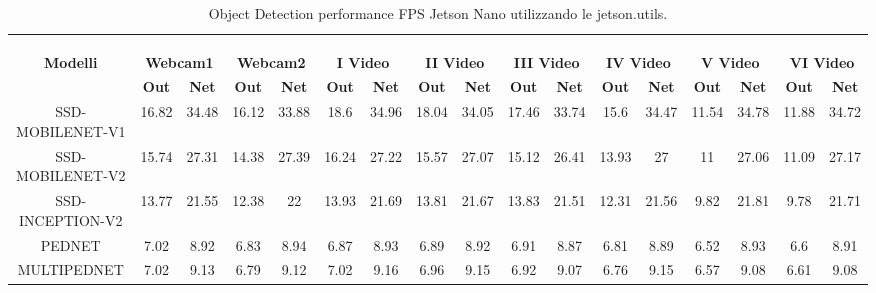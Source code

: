 \begin{landscape}
    \centering
    \begin{table}
        {\scriptsize %
        \begin{tabular}{|c||c|c||c|c||c|c||c|c||c|c||c|c||c|c||c|c||}
            \hline
            & \multicolumn{16}{c||}{ \multirow{3}{*}{\bfseries{\large OBJECT DETECTION (DETECTNET) - JETSON NANO (utils)}}}\\
            & \multicolumn{16}{c||}{}\\
            & \multicolumn{16}{c||}{}\\
            \hline
            \multirow{2}{*}{\bfseries{\large Modelli}} 
            & \multicolumn{2}{c||}{\bfseries{\normalsize Webcam1}} & \multicolumn{2}{c||}{\bfseries{\normalsize Webcam2}} & \multicolumn{2}{c||}{\bfseries{\normalsize \RN{1} Video}} & \multicolumn{2}{c||}{\bfseries{\normalsize \RN{2} Video}} & \multicolumn{2}{c||}{\bfseries{\normalsize \RN{3} Video}} & \multicolumn{2}{c||}{\bfseries{\normalsize \RN{4} Video}} & \multicolumn{2}{c||}{\bfseries{\normalsize \RN{5} Video}} & \multicolumn{2}{c||}{\bfseries{\normalsize \RN{6} Video}}\\            & \bfseries{\footnotesize Out} & \bfseries{\footnotesize Net} & \bfseries{\footnotesize Out} & \bfseries{\footnotesize Net} & \bfseries{\footnotesize Out} & \bfseries{\footnotesize Net} & \bfseries{\footnotesize Out} & \bfseries{\footnotesize Net} & \bfseries{\footnotesize Out} & \bfseries{\footnotesize Net} & \bfseries{\footnotesize Out} & \bfseries{\footnotesize Net} & \bfseries{\footnotesize Out} & \bfseries{\footnotesize Net} & \bfseries{\footnotesize Out} & \bfseries{\footnotesize Net}\\
            \hline
            SSD-MOBILENET-V1& 16.82 & 34.48 & 16.12 & 33.88 & 18.6 & 34.96 & 18.04 & 34.05 & 17.46 & 33.74 & 15.6 & 34.47 & 11.54 & 34.78 & 11.88 & 34.72\\
            \hline
            SSD-MOBILENET-V2& 15.74 & 27.31 & 14.38 & 27.39 & 16.24 & 27.22 & 15.57 & 27.07 & 15.12 & 26.41 & 13.93 & 27 & 11 & 27.06 & 11.09 & 27.17\\
            \hline 
            SSD-INCEPTION-V2& 13.77 & 21.55 & 12.38 & 22 & 13.93 & 21.69 & 13.81 & 21.67 & 13.83 & 21.51 & 12.31 & 21.56 & 9.82 & 21.81 & 9.78 & 21.71\\
            \hline
            PEDNET& 7.02 & 8.92 & 6.83 & 8.94 & 6.87 & 8.93 & 6.89 & 8.92 & 6.91 & 8.87 & 6.81 & 8.89 & 6.52 & 8.93 & 6.6 & 8.91\\
            \hline
            MULTIPEDNET& 7.02 & 9.13 & 6.79 & 9.12 & 7.02 & 9.16 & 6.96 & 9.15 & 6.92 & 9.07 & 6.76 & 9.15 & 6.57 & 9.08 & 6.61 & 9.08\\
            \hline
        \end{tabular}
        }%
        \vspace{0.5cm}
        \caption{Object Detection performance FPS Jetson Nano utilizzando le jetson.utils.}
        \label{obj_jetson_utils}
    \end{table}


\end{landscape}
